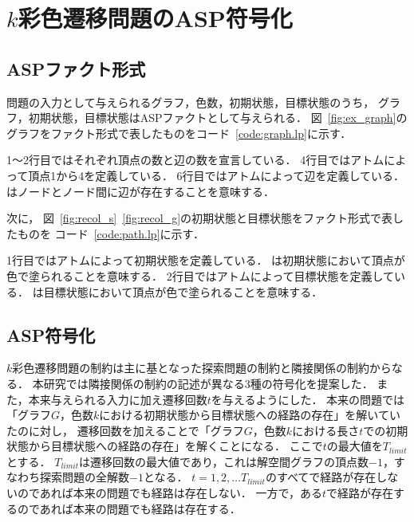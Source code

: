 \chapter{$k$彩色遷移問題のASP符号化} \label{chap:proposal}

\section{ASPファクト形式}
問題の入力として与えられるグラフ，色数，初期状態，目標状態のうち，
グラフ，初期状態，目標状態はASPファクトとして与えられる．
図~\ref{fig:ex_graph}のグラフをファクト形式で表したものをコード~\ref{code:graph.lp}に示す．



1～2行目ではそれぞれ頂点の数と辺の数を宣言している．
4行目ではアトムによって頂点1から4を定義している．
6行目ではアトムによって辺を定義している．
はノードとノード間に辺が存在することを意味する．

次に， 図~\ref{fig:recol_s}~\ref{fig:recol_g}の初期状態と目標状態をファクト形式で表したものを
コード~\ref{code:path.lp}に示す．



1行目ではアトムによって初期状態を定義している．
は初期状態において頂点が色で塗られることを意味する．
2行目ではアトムによって目標状態を定義している．
は目標状態において頂点が色で塗られることを意味する．

\section{ASP符号化}
$k$彩色遷移問題の制約は主に基となった探索問題の制約と隣接関係の制約からなる．
本研究では隣接関係の制約の記述が異なる3種の符号化を提案した．
また，本来与えられる入力に加え遷移回数$t$を与えるようにした．
本来の問題では「グラフ$G$，色数$k$における初期状態から目標状態への経路の存在」を解いていたのに対し，
遷移回数を加えることで「グラフ$G$，色数$k$における長さ$t$での初期状態から目標状態への経路の存在」を解くことになる．
ここで$t$の最大値を$T_{limit}$とする．
$T_{limit}$は遷移回数の最大値であり，これは解空間グラフの頂点数$-1$，すなわち探索問題の全解数$-1$となる．
$t=1, 2, \dots T_{limit}$のすべてで経路が存在しないのであれば本来の問題でも経路は存在しない．
一方で，ある$t$で経路が存在するのであれば本来の問題でも経路は存在する．

